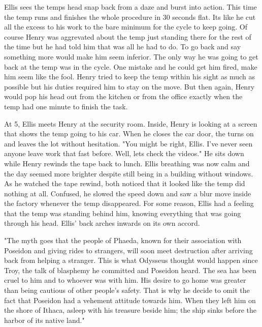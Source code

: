 \begin{Document}
        Ellis sees the temps head snap back from a daze and burst into action. This time the temp runs and finishes the whole procedure in 30 seconds flat. Its
    like he cut all the excess to his work to the bare minimum for the cycle to keep going. Of course Henry was aggrevated about the temp just standing there
    for the rest of the time but he had told him that was all he had to do. To go back and say something more would make him seem inferior. The only way he was
    going to get back at the temp was in the cycle. One mistake and he could get him fired, make him seem like the fool. Henry tried to keep the temp within his
    sight as much as possible but his duties required him to stay on the move. But then again, Henry would pop his head out from the kitchen or from the office
    exactly when the temp had one minute to finish the task.

        At 5, Ellis meets Henry at the security room. Inside, Henry is looking at a screen that shows the temp going to his car. When he closes the car door,
    the turns on and leaves the lot without hesitation. "You might be right, Ellis. I've never seen anyone leave work that fast before. Well, lets check the
    videos." He sits down while Henry rewinds the tape back to lunch. Ellis breathing was now calm and the day seemed more brighter despite still being in a
    building without windows. As he watched the tape rewind, both noticed that it looked like the temp did nothing at all. Confused, he slowed the speed down
    and saw a blur move inside the factory whenever the temp disappeared. For some reason, Ellis had a feeling that the temp was standing behind him, knowing
    everything that was going through his head. Ellis' back arches inwards on its own accord.

        "The myth goes that the people of Phaeda, known for their association with Poseidon and giving rides to strangers, will soon meet destruction after
    arriving back from helping a stranger. This is what Odysseus thought would happen since Troy, the talk of blasphemy he committed and Poseidon heard. The
    sea has been cruel to him and to whoever was with him. His desire to go home was greater than being cautious of other people's safety. That is why he decide
    to omit the fact that Poseidon had a vehement attitude towards him. When they left him on the shore of Ithaca, asleep with his treasure beside him; the ship
    sinks before the harbor of its native land."


\end{Document}
